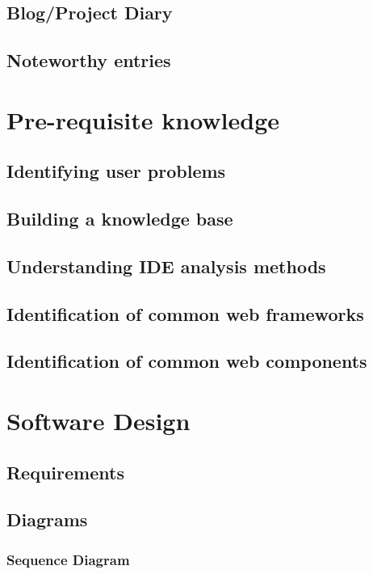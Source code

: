 \subsection{Blog/Project Diary}

\subsection{Noteworthy entries}

\section{Pre-requisite knowledge}
\subsection{Identifying user problems}
\subsection{Building a knowledge base}




\subsection{Understanding IDE analysis methods}
\subsection{Identification of common web frameworks}
\subsection{Identification of common web components}

\section{Software Design}
\subsection{Requirements}
\subsection{Diagrams}
\subsubsection{Sequence Diagram}


